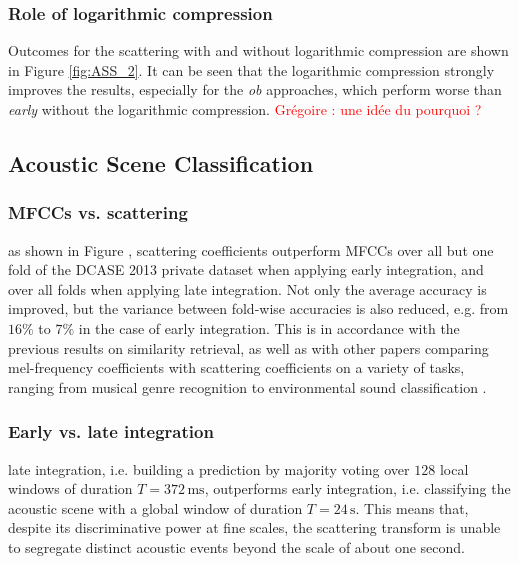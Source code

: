 \documentclass[journal]{IEEEtran}
\makeatletter
\newcommand*{\eg}{e.g.\@\xspace}
\newcommand*{\ie}{i.e.\@\xspace}
\newcommand*{\vs}{vs.\@\xspace}
\newcommand{\gl}[1]{\textcolor{red}{Gr\'egoire : #1}}
\makeatother
\begin{document}
\subsubsection*{Role of logarithmic compression}

Outcomes for the scattering with and without logarithmic compression are shown in Figure \ref{fig:ASS_2}. It can be seen that the logarithmic compression strongly improves the results, especially for the \emph{ob} approaches, which perform worse than \emph{early} without the logarithmic compression. \gl{une idée du pourquoi ?}

\subsection{Acoustic Scene Classification}

\subsubsection*{MFCCs \vs scattering}
as shown in Figure \cite{folds}, scattering coefficients outperform MFCCs over all but one fold of the DCASE 2013 private dataset when applying early integration, and over all folds when applying late integration.
Not only the average accuracy is improved, but the variance between fold-wise accuracies is also reduced, \eg from $16\%$ to $7\%$ in the case of early integration.
This is in accordance with the previous results on similarity retrieval, as well as with other papers comparing mel-frequency coefficients with scattering coefficients on a variety of tasks, ranging from musical genre recognition \cite{Anden2014} to environmental sound classification \cite{Salamon2015}.

\subsubsection*{Early \vs late integration}
late integration, \ie building a prediction by majority voting over $128$ local windows of duration $T=372\,\mathrm{ms}$, outperforms early integration, \ie classifying the acoustic scene with a global window of duration $T=24\,\mathrm{s}$.
This means that, despite its discriminative power at fine scales, the scattering transform is unable to segregate distinct acoustic events beyond the scale of about one second.
\end{document}
